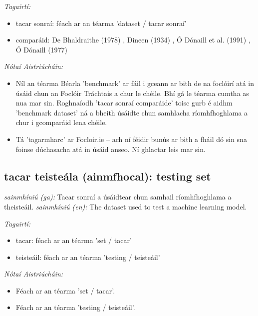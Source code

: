 \documentclass{article}
\begin{document}
 \noindent \textit{Tagairtí:}
\begin{itemize}
	\item tacar sonraí: féach ar an téarma 'dataset / tacar sonraí'
	\item comparáid: De Bhaldraithe (1978) \cite{de-bhaldraithe}, Dineen (1934) \cite{dineen}, Ó Dónaill et al. (1991) \cite{focloir-beag}, Ó Dónaill (1977) \cite{odonaill}
\end{itemize}

 \noindent \textit{Nótaí Aistriúcháin:}
\begin{itemize}
	\item Níl an téarma Béarla 'benchmark' ar fáil i gceann ar bith de na foclóirí atá in úsáid chun an Foclóir Tráchtais a chur le chéile. Bhí gá le téarma cumtha as nua mar sin. Roghnaíodh 'tacar sonraí comparáide' toisc gurb é aidhm 'benchmark dataset' ná a bheith úsáidte chun samhlacha ríomhfhoghlama a chur i gcomparáid lena chéile.
	\item Tá 'tagarmharc' ar Focloir.ie -- ach ní féidir bunús ar bith a fháil dó sin sna foinse dúchasacha atá in úsáid anseo. Ní ghlactar leis mar sin.
\end{itemize}


\subsection*{tacar teisteála (ainmfhocal): testing set} 
 \noindent \textit{sainmhíniú (ga):} Tacar sonraí a úsáidtear chun samhail ríomhfhoghlama a theisteáil.
\newline\newline
 \noindent \textit{sainmhíniú (en):} The dataset used to test a machine learning model.
\newline

 \noindent \textit{Tagairtí:}
\begin{itemize}
	\item tacar: féach ar an téarma 'set / tacar'
	\item teisteáil: féach ar an téarma 'testing / teisteáil'
\end{itemize}

 \noindent \textit{Nótaí Aistriúcháin:}
\begin{itemize}
	\item Féach ar an téarma 'set / tacar'.
	\item Féach ar an téarma 'testing / teisteáil'.
\end{itemize}
\end{document}
